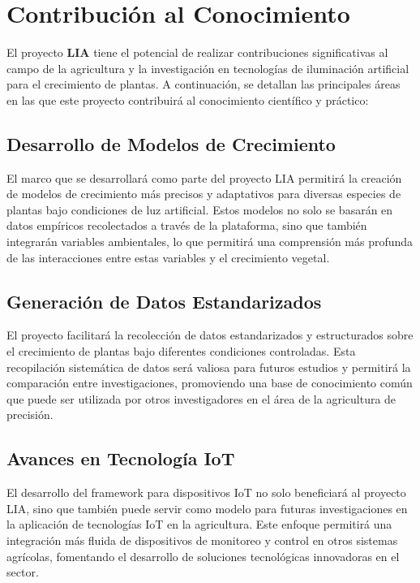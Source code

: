 
\section{Contribución al Conocimiento}

El proyecto \textbf{LIA} tiene el potencial de realizar contribuciones significativas al campo de la agricultura y la investigación en tecnologías de iluminación artificial para el crecimiento de plantas. A continuación, se detallan las principales áreas en las que este proyecto contribuirá al conocimiento científico y práctico:

\subsection{Desarrollo de Modelos de Crecimiento}
El marco que se desarrollará como parte del proyecto LIA permitirá la creación de modelos de crecimiento más precisos y adaptativos para diversas especies de plantas bajo condiciones de luz artificial. Estos modelos no solo se basarán en datos empíricos recolectados a través de la plataforma, sino que también integrarán variables ambientales, lo que permitirá una comprensión más profunda de las interacciones entre estas variables y el crecimiento vegetal.

\subsection{Generación de Datos Estandarizados}
El proyecto facilitará la recolección de datos estandarizados y estructurados sobre el crecimiento de plantas bajo diferentes condiciones controladas. Esta recopilación sistemática de datos será valiosa para futuros estudios y permitirá la comparación entre investigaciones, promoviendo una base de conocimiento común que puede ser utilizada por otros investigadores en el área de la agricultura de precisión.

\subsection{Avances en Tecnología IoT}
El desarrollo del framework para dispositivos IoT no solo beneficiará al proyecto LIA, sino que también puede servir como modelo para futuras investigaciones en la aplicación de tecnologías IoT en la agricultura. Este enfoque permitirá una integración más fluida de dispositivos de monitoreo y control en otros sistemas agrícolas, fomentando el desarrollo de soluciones tecnológicas innovadoras en el sector.


